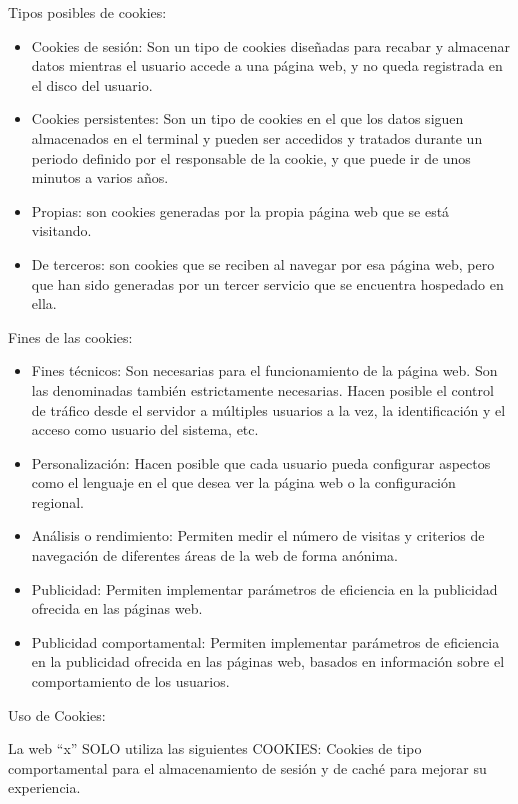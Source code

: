 \documentclass[
  a4paper,
  openany]{book}
\begin{document}
Tipos posibles de cookies:

\begin{itemize}
\item
  Cookies de sesión: Son un tipo de cookies diseñadas para recabar y almacenar datos mientras el usuario accede a una página web, y no queda registrada en el disco del usuario.
\item
  Cookies persistentes: Son un tipo de cookies en el que los datos siguen almacenados en el terminal y pueden ser accedidos y tratados durante un periodo definido por el responsable de la cookie, y que puede ir de unos minutos a varios años.
\item
  Propias: son cookies generadas por la propia página web que se está visitando.
\item
  De terceros: son cookies que se reciben al navegar por esa página web, pero que han sido generadas por un tercer servicio que se encuentra hospedado en ella.
\end{itemize}

Fines de las cookies:

\begin{itemize}
\item
  Fines técnicos: Son necesarias para el funcionamiento de la página web. Son las denominadas también estrictamente necesarias. Hacen posible el control de tráfico desde el servidor a múltiples usuarios a la vez, la identificación y el acceso como usuario del sistema, etc.
\item
  Personalización: Hacen posible que cada usuario pueda configurar aspectos como el lenguaje en el que desea ver la página web o la configuración regional.
\item
  Análisis o rendimiento: Permiten medir el número de visitas y criterios de navegación de diferentes áreas de la web de forma anónima.
\item
  Publicidad: Permiten implementar parámetros de eficiencia en la publicidad ofrecida en las páginas web.
\item
  Publicidad comportamental: Permiten implementar parámetros de eficiencia en la publicidad ofrecida en las páginas web, basados en información sobre el comportamiento de los usuarios.
\end{itemize}

Uso de Cookies:

La web ``x'' SOLO utiliza las siguientes COOKIES: Cookies de tipo comportamental para el almacenamiento de sesión y de caché para mejorar su experiencia.
\end{document}
